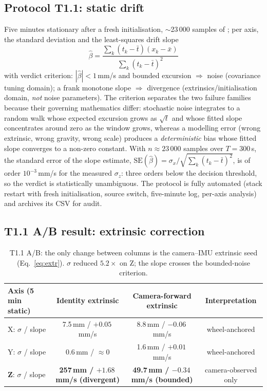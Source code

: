 \subsection{Protocol T1.1: static drift}
Five minutes stationary after a fresh initialisation, $\sim$23\,000 samples
of ; per axis, the standard deviation and the
least-squares drift slope
\begin{equation}
\hat{\beta} = \frac{\sum_k (t_k-\bar t)(x_k-\bar x)}{\sum_k (t_k-\bar t)^2}
\end{equation}
with verdict criterion: $|\hat\beta| < 1$\,mm/s and bounded excursion
$\Rightarrow$ noise (covariance tuning domain); a frank monotone slope
$\Rightarrow$ divergence (extrinsics/initialisation domain, \emph{not} noise
parameters). The criterion separates the two failure families because their
governing mathematics differ: stochastic noise integrates to a random walk
whose expected excursion grows as $\sqrt{t}$ and whose fitted slope
concentrates around zero as the window grows, whereas a modelling error
(wrong extrinsic, wrong gravity, wrong scale) produces a \emph{deterministic}
bias whose fitted slope converges to a non-zero constant. With
$n \approx 23\,000$ samples over $T = 300$\,s, the standard error of the
slope estimate,
$\mathrm{SE}(\hat\beta) = \sigma_x \big/ \sqrt{\sum_k (t_k - \bar t)^2}$,
is of order $10^{-3}$\,mm/s for the measured $\sigma_z$: three orders
below the decision threshold, so the verdict is statistically unambiguous.
The protocol is fully automated (stack restart with fresh initialisation,
source switch, five-minute log, per-axis analysis) and archives its CSV for
audit.

\subsection{T1.1 A/B result: extrinsic correction}
\label{sec:t11}
\begin{table}[htbp]
\centering\small
\begin{tabular}{@{}lccc@{}}
\toprule
Axis (5 min static) & Identity extrinsic & Camera-forward extrinsic & Interpretation \\
\midrule
X: $\sigma$ / slope & 7.5\,mm / $+0.05$\,mm/s & 8.8\,mm / $-0.06$\,mm/s & wheel-anchored \\
Y: $\sigma$ / slope & 0.6\,mm / $\approx 0$ & 1.6\,mm / $+0.01$\,mm/s & wheel-anchored \\
\textbf{Z}: $\sigma$ / slope & \textbf{257\,mm / $+1.68$\,mm/s (divergent)} &
\textbf{49.7\,mm / $-0.34$\,mm/s (bounded)} & camera-observed only \\
\bottomrule
\end{tabular}
\caption{T1.1 A/B: the only change between columns is the camera--IMU
extrinsic seed (Eq.~\ref{eq:extr}). $\sigma$ reduced $5.2\times$ on Z; the
slope crosses the bounded-noise criterion.}
\label{tab:t11}
\end{table}

